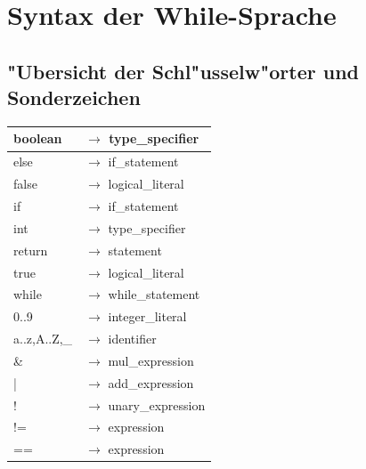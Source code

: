 \documentclass[10pt,a4paper,titlepage]{article}
\begin{document}
\section{Syntax der While-Sprache}
\subsection{"Ubersicht der Schl"usselw"orter und Sonderzeichen}
\begin{ttfamily}
\begin{tabular}{| l  l |}
\hline
\hspace*{1.5cm}boolean & $\to$ type\_specifier\hspace*{2cm}\\\hline
\hspace*{1.5cm}else & $\to$ if\_statement\hspace*{2cm}\\\hline
\hspace*{1.5cm}false & $\to$ logical\_literal\\\hline
\hspace*{1.5cm}if & $\to$ if\_statement\\\hline
\hspace*{1.5cm}int & $\to$ type\_specifier\\\hline
\hspace*{1.5cm}return & $\to$ statement\\\hline
\hspace*{1.5cm}true & $\to$ logical\_literal\\\hline
\hspace*{1.5cm}while & $\to$ while\_statement\\\hline
\hspace*{1.5cm}0..9 & $\to$ integer\_literal\\\hline
\hspace*{1.5cm}a..z,A..Z,\_\hspace*{1cm} & $\to$ identifier\\\hline
\hspace*{1.5cm}\& & $\to$ mul\_expression\\\hline
\hspace*{1.5cm}| & $\to$ add\_expression\\\hline
\hspace*{1.5cm}! & $\to$ unary\_expression\\\hline
\hspace*{1.5cm}!= & $\to$ expression\\\hline
\hspace*{1.5cm}== & $\to$ expression\\\hline

\end{tabular}
\end{ttfamily}
\end{document}
